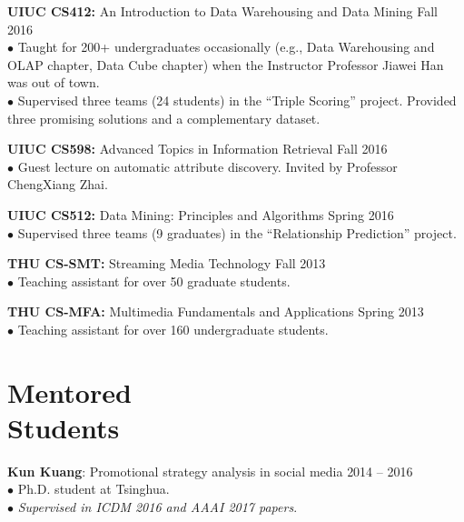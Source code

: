 \documentclass[margin, 10pt]{res}
\begin{document}
\begin{resume}
{\textbf{UIUC CS412:} An Introduction to Data Warehousing and Data Mining} \hfill{Fall 2016} \\
$\bullet$ Taught for 200+ undergraduates occasionally (e.g., Data Warehousing and OLAP chapter, Data Cube chapter) when the Instructor Professor Jiawei Han was out of town. \\
$\bullet$ Supervised three teams (24 students) in the ``Triple Scoring'' project. Provided three promising solutions and a complementary dataset.

{\textbf{UIUC CS598:} Advanced Topics in Information Retrieval} \hfill{Fall 2016} \\
$\bullet$ Guest lecture on automatic attribute discovery. Invited by Professor ChengXiang Zhai.

{\textbf{UIUC CS512:} Data Mining: Principles and Algorithms} \hfill{Spring 2016} \\
$\bullet$ Supervised three teams (9 graduates) in the ``Relationship Prediction'' project.

{\textbf{THU CS-SMT:} Streaming Media Technology} \hfill{Fall 2013} \\
$\bullet$ Teaching assistant for over 50 {graduate} students.

{\textbf{THU CS-MFA:} Multimedia Fundamentals and Applications} \hfill{Spring 2013} \\
$\bullet$ Teaching assistant for over 160 {undergraduate} students.


\section{Mentored \\ Students}


{\textbf{Kun Kuang}: Promotional strategy analysis in social media} \hfill{2014 -- 2016} \\
$\bullet$ Ph.D. student at Tsinghua. \\
$\bullet$ \textit{Supervised in ICDM 2016 and AAAI 2017 papers}.


\end{resume}
\end{document}
